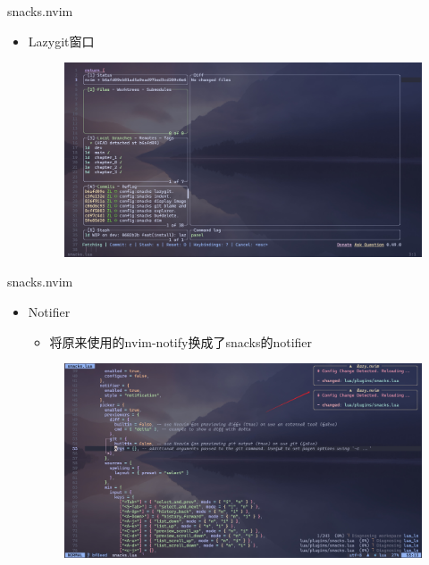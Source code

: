 \documentclass[aspectratio=169]{ctexbeamer}
\begin{document}
  \begin{frame}{snacks.nvim}
    \begin{itemize}
      \item Lazygit窗口
        \begin{figure}[H]
          \centering
          \includegraphics[width=0.7\linewidth]{./Figures/Snacks_Config_5_Lazygit.jpg}
        \end{figure}
    \end{itemize}
  \end{frame}

  \begin{frame}{snacks.nvim}
    \begin{itemize}
      \item Notifier
        \begin{itemize}
          \item 将原来使用的nvim-notify换成了snacks的notifier
        \end{itemize}
        \begin{figure}[H]
          \centering
          \includegraphics[width=0.7\linewidth]{./Figures/Snacks_Config_6_Notifier.jpg}
        \end{figure}
    \end{itemize}
  \end{frame}
\end{document}
